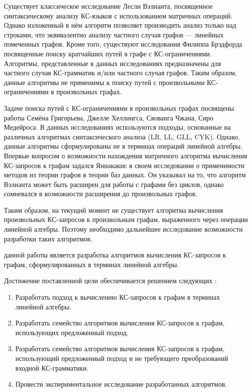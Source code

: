 Существует классическое исследование Лесли Вэлианта, посвященное синтаксическому анализу КС-языков с использованием матричных операций. Однако изложенный в нём алгоритм позволяет производить анализ только над строками, что эквивалентно анализу частного случая графов --- линейных помеченных графов. Кроме того, существуют исследования Филиппа Брэдфорда посвященные поиску кратчайших путей в графе с КС-ограничениями. Алгоритмы, представленные в данных исследованиях предназначены для частного случая КС-грамматик и/или частного случая графов. Таким образом, данные алгоритмы не применимы к поиску путей с произвольными КС-ограничениями в произвольных графах.

Задаче поиска путей с КС-ограничениями в произвольных графах посвящены работы Семёна Григорьева, Джелле Хеллингса, Сяованга Чжана, Сиро Медейроса. В данных исследованиях используются подходы, основанные на различных алгоритмах синтаксического анализа (LR, LL, GLL, CYK). Однако, данные алгоритмы сформулированы не в терминах операций линейной алгебры. Впервые вопросом о возможности нахождения матричного алгоритма вычисления КС-запросов к графам задался Яннакакис в своем исследовании о применимости методов из теории графов в теории баз данных. Он указывал на то, что алгоритм Вэлианта может быть расширен для работы с графами без циклов, однако сомневался в возможности расширения до произвольных графов.

Таким образом, на текущий момент не существует алгоритма вычисления произвольных КС-запросов к произвольным графам, выраженного через операции линейной алгебры. Поэтому необходимо дальнейшее исследование возможности разработки таких алгоритмов.

{\aim} данной работы является разработка алгоритмов вычисления КС-запросов к графам, сформулированных в терминах линейной алгебры.

Достижение поставленной цели обеспечивается решением следующих {\tasks}:
\begin{enumerate}[beginpenalty=10000] %
  \item Разработать подход к вычислению КС-запросов к графам в терминах линейной алгебры.
  \item Разработать семейство алгоритмов вычисления КС-запросов к графам, использующих предложенный подход.
  \item Разработать семейство алгоритмов вычисления КС-запросов к графам, использующий предложенный подход и не требующего преобразований входной КС-грамматики.
  \item Провести экспериментальное исследование разработанных алгоритмов.
\end{enumerate}



